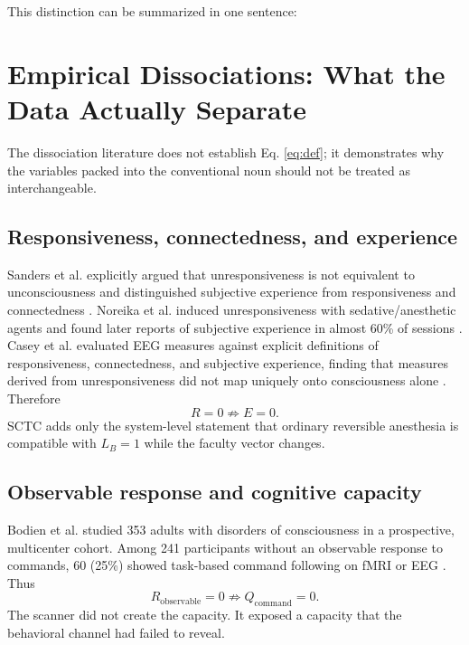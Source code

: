 This distinction can be summarized in one sentence:


\section{Empirical Dissociations: What the Data Actually Separate}
The dissociation literature does not establish Eq. \ref{eq:def}; it demonstrates why the variables packed into the conventional noun should not be treated as interchangeable.

\subsection{Responsiveness, connectedness, and experience}
Sanders et al. explicitly argued that unresponsiveness is not equivalent to unconsciousness and distinguished subjective experience from responsiveness and connectedness \cite{Sanders2012}. Noreika et al. induced unresponsiveness with sedative/anesthetic agents and found later reports of subjective experience in almost 60\% of sessions \cite{Noreika2011}. Casey et al. evaluated EEG measures against explicit definitions of responsiveness, connectedness, and subjective experience, finding that measures derived from unresponsiveness did not map uniquely onto consciousness alone \cite{Casey2024}. Therefore
\begin{equation}
R=0\not\Rightarrow E=0.
\end{equation}
SCTC adds only the system-level statement that ordinary reversible anesthesia is compatible with $L_B=1$ while the faculty vector changes.

\subsection{Observable response and cognitive capacity}
Bodien et al. studied 353 adults with disorders of consciousness in a prospective, multicenter cohort. Among 241 participants without an observable response to commands, 60 (25\%) showed task-based command following on fMRI or EEG \cite{Bodien2024}. Thus
\begin{equation}
R_{\mathrm{observable}}=0\not\Rightarrow Q_{\mathrm{command}}=0.
\end{equation}
The scanner did not create the capacity. It exposed a capacity that the behavioral channel had failed to reveal.

